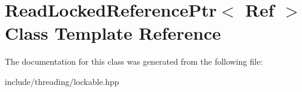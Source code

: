 \hypertarget{class_read_locked_reference_ptr}{\section{Read\-Locked\-Reference\-Ptr$<$ Ref $>$ Class Template Reference}
\label{class_read_locked_reference_ptr}
}


The documentation for this class was generated from the following file\-:\begin{DoxyCompactItemize}
\item 
include/threading/lockable.\-hpp\end{DoxyCompactItemize}
